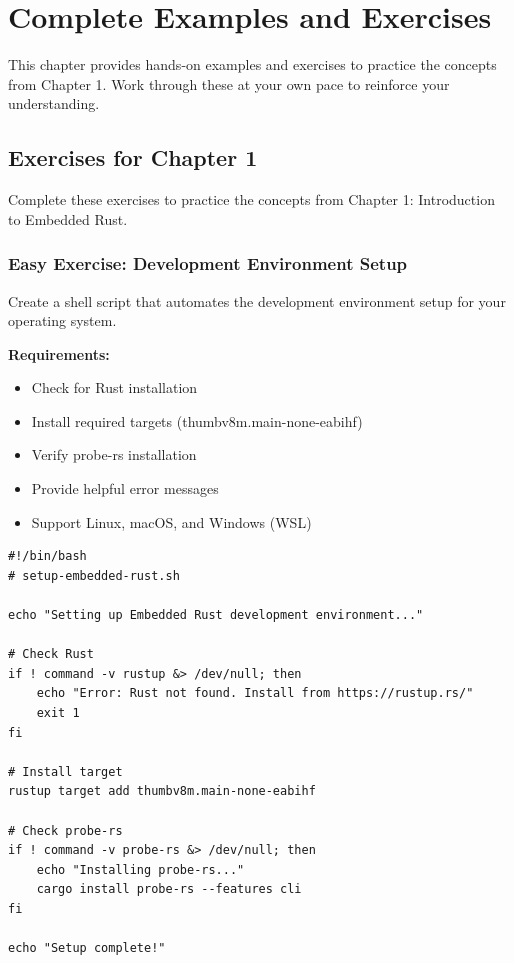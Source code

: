 \chapter{Complete Examples and Exercises}
\label{ch:examples-exercises}

This chapter provides hands-on examples and exercises to practice the concepts from Chapter 1. Work through these at your own pace to reinforce your understanding.

\section{Exercises for Chapter 1}
\label{sec:ch1-exercises}

Complete these exercises to practice the concepts from Chapter 1: Introduction to Embedded Rust.

\subsection{Easy Exercise: Development Environment Setup}
\label{subsec:easy-setup}

Create a shell script that automates the development environment setup for your operating system.

\textbf{Requirements:}
\begin{itemize}
    \item Check for Rust installation
    \item Install required targets (thumbv8m.main-none-eabihf)
    \item Verify probe-rs installation
    \item Provide helpful error messages
    \item Support Linux, macOS, and Windows (WSL)
\end{itemize}

\begin{verbatim}
#!/bin/bash
# setup-embedded-rust.sh

echo "Setting up Embedded Rust development environment..."

# Check Rust
if ! command -v rustup &> /dev/null; then
    echo "Error: Rust not found. Install from https://rustup.rs/"
    exit 1
fi

# Install target
rustup target add thumbv8m.main-none-eabihf

# Check probe-rs
if ! command -v probe-rs &> /dev/null; then
    echo "Installing probe-rs..."
    cargo install probe-rs --features cli
fi

echo "Setup complete!"
\end{verbatim}


